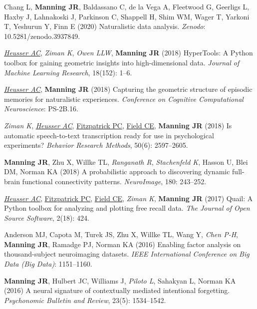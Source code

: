 \documentclass[11pt, a4paper]{article} %
\begin{document}
\begin{etaremune}
\item Chang L, \textbf{Manning JR}, Baldassano C, de la Vega A, Fleetwood G, Geerligs L, Haxby J, Lahnakoski J, Parkinson C, Shappell H, Shim WM, Wager T, Yarkoni T, Yeshurun Y, Finn E (2020) Naturalistic data analysis. \textit{Zenodo}: 10.5281/zenodo.3937849.

\item \ul{\textit{Heusser AC}}, \textit{Ziman K}, \textit{Owen LLW}, \textbf{Manning JR} (2018) HyperTools: A Python toolbox for gaining geometric insights into high-dimensional data. \textit{Journal of Machine Learning Research}, 18(152): 1--6.

\item \ul{\textit{Heusser AC}}, \textbf{Manning JR} (2018) Capturing the geometric structure of episodic memories for naturalistic experiences. \textit{Conference on Cognitive Computational Neuroscience}: PS-2B.16.

\item \textit{Ziman K}, \ul{\textit{Heusser AC}}, \ul{Fitzpatrick PC}, \ul{Field CE}, \textbf{Manning JR} (2018) Is automatic speech-to-text transcription ready for use in psychological experiments? \textit{Behavior Research Methods}, 50(6): 2597--2605.

\item \textbf{Manning JR}, Zhu X, Willke TL, \textit{Ranganath R}, \textit{Stachenfeld K}, Hasson U, Blei DM, Norman KA (2018) A probabilistic approach to discovering dynamic full-brain functional connectivity patterns. \textit{NeuroImage}, 180: 243--252.

\item \ul{\textit{Heusser AC}}, \ul{Fitzpatrick PC}, \ul{Field CE}, \textit{Ziman K}, \textbf{Manning JR} (2017) Quail: A Python toolbox for analyzing and plotting free recall data. \textit{The Journal of Open Source Software}, 2(18): 424.

\item Anderson MJ, Capota M, Turek JS, Zhu X, Willke TL, Wang Y, \textit{Chen P-H}, \textbf{Manning JR}, Ramadge PJ, Norman KA (2016) Enabling factor analysis on thousand-subject neuroimaging datasets. \textit{IEEE International Conference on Big Data (Big Data)}: 1151--1160.

\item \textbf{Manning JR}, Hulbert JC, Williams J, \textit{Piloto L}, Sahakyan L, Norman KA (2016) A neural signature of contextually mediated intentional forgetting. \textit{Psychonomic Bulletin and Review}, 23(5): 1534--1542.


\end{etaremune}
\end{document}

